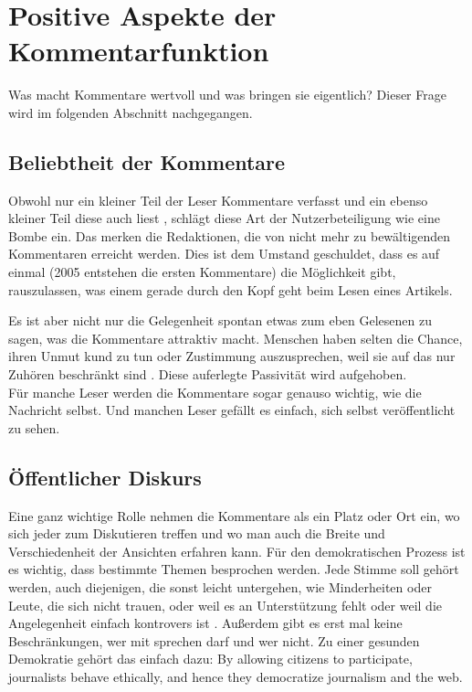 \chapter{Positive Aspekte der Kommentarfunktion}

Was macht Kommentare wertvoll und was bringen sie eigentlich? Dieser Frage wird
im folgenden Abschnitt nachgegangen.


\section{Beliebtheit der Kommentare} \label{sec:beliebtheit}
Obwohl nur ein kleiner Teil der Leser Kommentare verfasst und ein ebenso kleiner
Teil diese auch liest \autocite[96ff]{reich}, schlägt diese Art der
Nutzerbeteiligung wie eine Bombe ein. Das merken die Redaktionen, die von nicht
mehr zu bewältigenden Kommentaren erreicht werden. Dies ist dem Umstand
geschuldet, dass es auf einmal (2005 entstehen die ersten Kommentare) die
Möglichkeit gibt, rauszulassen, was einem gerade durch den Kopf geht beim Lesen
eines Artikels.

Es ist aber nicht nur die Gelegenheit spontan etwas zum eben Gelesenen zu sagen,
was die Kommentare attraktiv macht. Menschen haben selten die Chance, ihren
Unmut kund zu tun oder Zustimmung auszusprechen, weil sie auf das nur Zuhören
beschränkt sind \autocite[S.~99]{reich}. Diese auferlegte Passivität wird
aufgehoben.\\
Für manche Leser werden die Kommentare sogar genauso wichtig, wie die Nachricht
selbst. Und manchen Leser gefällt es einfach, sich selbst veröffentlicht zu
sehen.


\section{Öffentlicher Diskurs}
Eine ganz wichtige Rolle nehmen die Kommentare als ein Platz oder Ort ein, wo
sich jeder zum Diskutieren treffen und wo man auch die Breite und
Verschiedenheit der Ansichten erfahren kann. Für den demokratischen Prozess ist
es wichtig, dass bestimmte Themen besprochen werden. Jede Stimme soll gehört
werden, auch diejenigen, die sonst leicht untergehen, wie Minderheiten oder
Leute, die sich nicht trauen, oder weil es an Unterstützung fehlt oder weil die
Angelegenheit einfach kontrovers ist \autocite[S.~12]{santana:2014}. Außerdem
gibt es erst mal keine Beschränkungen, wer mit sprechen darf und wer nicht.  Zu
einer gesunden Demokratie gehört das einfach dazu: \glqq By allowing citizens to
participate, journalists behave ethically, and hence they democratize journalism
and the web.\grqq\- \autocite[S.~125]{singer}


